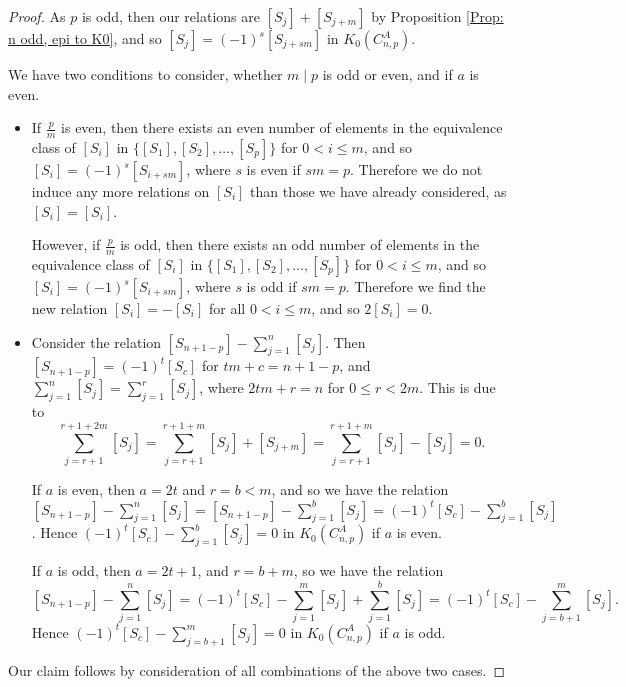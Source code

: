 \documentclass[10pt,a4paper]{amsart}
\begin{document}
\begin{proof}
	As $p$ is odd, then our relations are $[S_j] + [S_{j+m}]$ by Proposition \ref{Prop: n odd, epi to K0}, and so $[S_j] = (-1)^s[S_{j+sm}]$ in $K_0(C_{n,p}^A)$.
	
	We have two conditions to consider, whether $m \mid p$ is odd or even, and if $a$ is even.
	\begin{itemize}
		\item 	If $\frac{p}{m}$ is even, then there exists an even number of elements in the equivalence class of $[S_i]$ in $\{[S_1],[S_2], \ldots, [S_p]\}$ for $0 < i \leq m$, and so $[S_i] = (-1)^s[S_{i+sm}]$, where $s$ is even if $sm=p$.
		Therefore we do not induce any more relations on $[S_i]$ than those we have already considered, as $[S_i] = [S_i]$.
		
		However, if $\frac{p}{m}$ is odd, then there exists an odd number of elements in the equivalence class of $[S_i]$ in $\{[S_1],[S_2], \ldots, [S_p]\}$ for $0 < i \leq m$, and so $[S_i] = (-1)^s[S_{i+sm}]$, where $s$ is odd if $sm=p$.
		Therefore we find the new relation $[S_i] = -[S_i]$ for all $0 < i \leq m$, and so $2[S_i]=0$.\\
		
		\item Consider the relation $[S_{n+1-p}] - \sum_{j=1}^n [S_j]$.
		Then $[S_{n+1-p}] = (-1)^t[S_c]$ for $tm + c = n+1-p$, and $\sum_{j=1}^n [S_j] = \sum_{j=1}^r [S_j]$, where $2tm + r =n$ for $0 \leq r < 2m$.
		This is due to
		\[
		\sum_{j=r+1}^{r+1+2m} [S_j] = \sum_{j=r+1}^{r+1+m} [S_j] + [S_{j+m}] = \sum_{j=r+1}^{r+1+m} [S_j] - [S_j] = 0.
		\]
		
		If $a$ is even, then $a=2t$ and $r=b < m$, and so we have the relation $[S_{n+1-p}] - \sum_{j=1}^n [S_j] = [S_{n+1-p}] - \sum_{j=1}^b [S_j] = (-1)^t[S_c] - \sum_{j=1}^b [S_j]$.
		Hence $(-1)^t[S_c] - \sum_{j=1}^b [S_j] =0$ in $K_0(C_{n,p}^A)$ if $a$ is even.
		
		If $a$ is odd, then $a=2t+1$, and $r=b+m$, so we have the relation
		\[
		[S_{n+1-p}] - \sum_{j=1}^n [S_j] = (-1)^t[S_c] - \sum_{j=1}^m [S_j] + \sum_{j=1}^b [S_j] = (-1)^t [S_c] - \sum_{j=b+1}^m [S_j].
		\]
		Hence $(-1)^t [S_c] - \sum_{j=b+1}^m [S_j] = 0$ in $K_0(C_{n,p}^A)$ if $a$ is odd.
	\end{itemize}
	
	Our claim follows by consideration of all combinations of the above two cases.
\end{proof}
\end{document}
